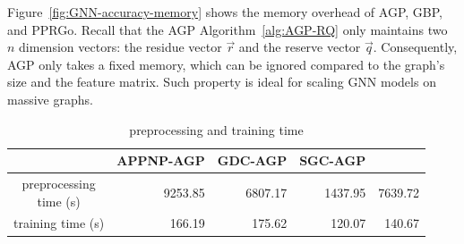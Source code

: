 Figure~\ref{fig:GNN-accuracy-memory} shows the memory overhead of AGP, GBP, and PPRGo. Recall that the AGP Algorithm~\ref{alg:AGP-RQ} only maintains two $n$ dimension vectors: the residue vector $\vec{r}$ and the reserve vector $\vec{q}$. Consequently, AGP only takes a fixed memory, which can be ignored compared to the graph's size and the feature matrix. Such property is ideal for scaling GNN models on massive graphs. %


\begin{table}[h]
	\centering
	\tblcapup
	\caption{preprocessing and training time}
	\vspace{-4mm}
	\tblcapdown
	\begin{small}
		\begin{tabular}{|c|r|r|r|r|} %
			\hline
			{\bf } & {\bf APPNP-AGP }\hspace{-1mm} & {\bf GDC-AGP} & {\bf SGC-AGP}& \makecell[c]{{\bf PPRGo}} \\ \hline
 \hspace{-1mm} \makecell[c]{preprocessing\\ time (s)} \hspace{-2mm} & 9253.85 \hspace{-1mm} &   6807.17& 1437.95 & 7639.72  \\ \hline
   \hspace{-1mm}training time (s)  \hspace{-2mm}  & 166.19  \hspace{-1mm}   & 175.62   & 120.07 & 140.67 \\
			\hline
		\end{tabular}
	\end{small}
	\label{tbl:propagation-training}
\end{table}







